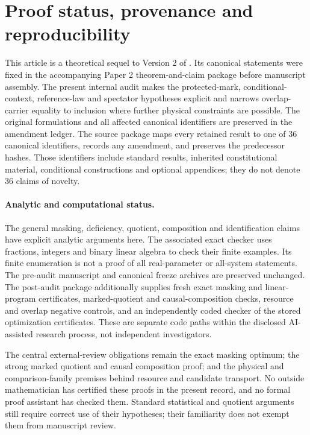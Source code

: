 

\section{Proof status, provenance and reproducibility}\label{app:provenance}
This article is a theoretical sequel to Version 2 of \cite{RodgersSPC2}. Its canonical statements were fixed in the accompanying Paper 2 theorem-and-claim package before manuscript assembly. The present internal audit makes the protected-mark, conditional-context, reference-law and spectator hypotheses explicit and narrows overlap-carrier equality to inclusion where further physical constraints are possible. The original formulations and all affected canonical identifiers are preserved in the amendment ledger. The source package maps every retained result to one of 36 canonical identifiers, records any amendment, and preserves the predecessor hashes. Those identifiers include standard results, inherited constitutional material, conditional constructions and optional appendices; they do not denote 36 claims of novelty.

\paragraph{Analytic and computational status.}
The general masking, deficiency, quotient, composition and identification claims have explicit analytic arguments here. The associated exact checker uses fractions, integers and binary linear algebra to check their finite examples. Its finite enumeration is not a proof of all real-parameter or all-system statements. The pre-audit manuscript and canonical freeze archives are preserved unchanged. The post-audit package additionally supplies fresh exact masking and linear-program certificates, marked-quotient and causal-composition checks, resource and overlap negative controls, and an independently coded checker of the stored optimization certificates. These are separate code paths within the disclosed AI-assisted research process, not independent investigators.

The central external-review obligations remain the exact masking optimum; the strong marked quotient and causal composition proof; and the physical and comparison-family premises behind resource and candidate transport. No outside mathematician has certified these proofs in the present record, and no formal proof assistant has checked them. Standard statistical and quotient arguments still require correct use of their hypotheses; their familiarity does not exempt them from manuscript review.

